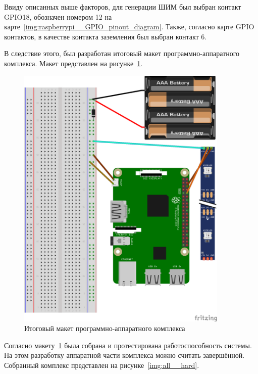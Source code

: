 Ввиду описанных выше факторов, для генерации ШИМ был выбран контакт GPIO18, обозначен номером 12 на карте~\ref{img:raspberrypi__GPIO_pinout_diagram}. Также, согласно карте GPIO контактов, в качестве контакта заземления был выбран контакт 6.

В следствие этого, был разработан итоговый макет программно-аппаратного комплекса. Макет представлен на рисунке~\ref{img:all__schema}.

\begin{figure}[H]
  \centering
  \includegraphics[angle=-90, width=0.9\textwidth]{assets/images/practical/Итоговая архитектура программно-аппаратного комплекса.png}
  \caption{Итоговый макет программно-аппаратного комплекса}
  \label{img:all__schema}
\end{figure}

Согласно макету~\ref{img:all__schema} была собрана и протестирована работоспособность системы. На этом разработку аппаратной части комплекса можно считать завершённой. Собранный комплекс представлен на рисунке~\ref{img:all__hard}.

